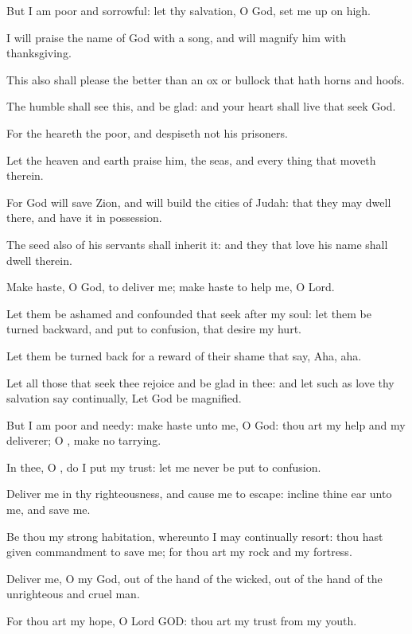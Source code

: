 \Verse But I am poor and sorrowful: let thy salvation, O God, set me up on high.

\Verse I will praise the name of God with a song, and will magnify him with thanksgiving.

\Verse This also shall please the \LORD better than an ox or bullock that hath horns and hoofs.

\Verse The humble shall see this, and be glad: and your heart shall live that seek God.

\Verse For the \LORD heareth the poor, and despiseth not his prisoners.

\Verse Let the heaven and earth praise him, the seas, and every thing that moveth therein.

\Verse For God will save Zion, and will build the cities of Judah: that they may dwell there, and have it in possession.

\Verse The seed also of his servants shall inherit it: and they that love his name shall dwell therein.




\Chapter
\Verse Make haste, O God, to deliver me; make haste to help me, O Lord.

\Verse Let them be ashamed and confounded that seek after my soul: let them be turned backward, and put to confusion, that desire my hurt.

\Verse Let them be turned back for a reward of their shame that say, Aha, aha.

\Verse Let all those that seek thee rejoice and be glad in thee: and let such as love thy salvation say continually, Let God be magnified.

\Verse But I am poor and needy: make haste unto me, O God: thou art my help and my deliverer; O \LORD, make no tarrying.




\Chapter
\Verse In thee, O \LORD, do I put my trust: let me never be put to confusion.

\Verse Deliver me in thy righteousness, and cause me to escape: incline thine ear unto me, and save me.

\Verse Be thou my strong habitation, whereunto I may continually resort: thou hast given commandment to save me; for thou art my rock and my fortress.

\Verse Deliver me, O my God, out of the hand of the wicked, out of the hand of the unrighteous and cruel man.

\Verse For thou art my hope, O Lord GOD: thou art my trust from my youth.

